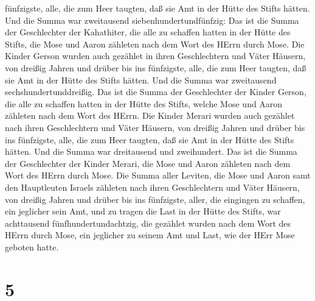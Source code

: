 fünfzigste, alle, die zum Heer taugten, daß sie Amt in der Hütte des
Stifts hätten.  Und die Summa war zweitausend
siebenhundertundfünfzig:  Das ist die Summa der
Geschlechter der Kahathiter, die alle zu schaffen hatten in der Hütte
des Stifts, die Mose und Aaron zähleten nach dem Wort des HErrn durch
Mose.  Die Kinder Gerson wurden auch gezählet in ihren
Geschlechtern und Väter Häusern,  von dreißig Jahren und
drüber bis ins fünfzigste, alle, die zum Heer taugten, daß sie Amt in
der Hütte des Stifts hätten.  Und die Summa war zweitausend
sechshundertunddreißig.  Das ist die Summa der Geschlechter
der Kinder Gerson, die alle zu schaffen hatten in der Hütte des Stifts,
welche Mose und Aaron zähleten nach dem Wort des HErrn. 
Die Kinder Merari wurden auch gezählet nach ihren Geschlechtern und
Väter Häusern,  von dreißig Jahren und drüber bis ins
fünfzigste, alle, die zum Heer taugten, daß sie Amt in der Hütte des
Stifts hätten.  Und die Summa war dreitausend und
zweihundert.  Das ist die Summa der Geschlechter der Kinder
Merari, die Mose und Aaron zähleten nach dem Wort des HErrn durch Mose.
 Die Summa aller Leviten, die Mose und Aaron samt den
Hauptleuten Israels zähleten nach ihren Geschlechtern und Väter Häusern,
 von dreißig Jahren und drüber bis ins fünfzigste, aller,
die eingingen zu schaffen, ein jeglicher sein Amt, und zu tragen die
Last in der Hütte des Stifts,  war achttausend
fünfhundertundachtzig,  die gezählet wurden nach dem Wort
des HErrn durch Mose, ein jeglicher zu seinem Amt und Last, wie der HErr
Mose geboten hatte.

\hypertarget{section-4}{%
\section{5}\label{section-4}}


